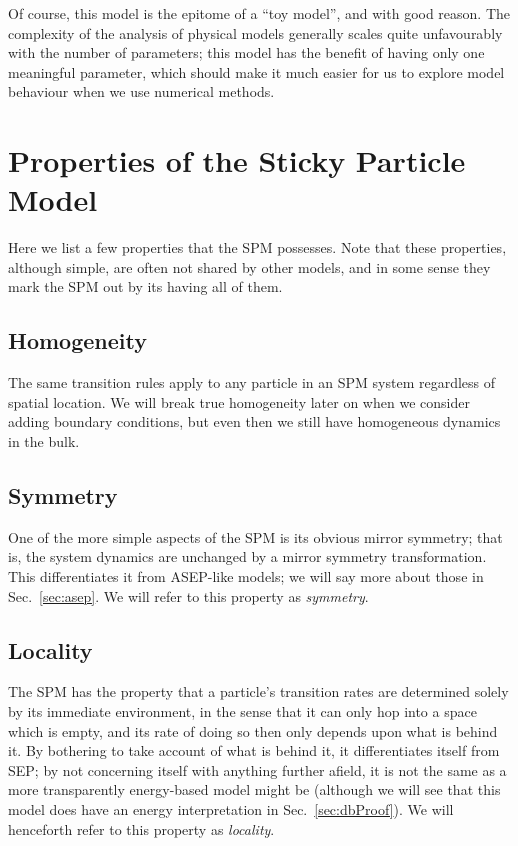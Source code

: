 Of course, this model is the epitome of a ``toy model'', and with good reason. The complexity of the
analysis of physical models generally scales quite unfavourably with the number of parameters; this model
has the benefit of having only one meaningful parameter, which should make it much easier for us
to explore model behaviour when we use numerical methods.

\section{Properties of the Sticky Particle Model}
Here we list a few properties that the SPM possesses. Note that these properties, although simple, are
often not shared by other models, and in some sense they mark the SPM out by its having all of them.
\subsection{Homogeneity}
The same transition rules apply to any particle in an SPM system regardless of spatial location.
We will break true homogeneity later on when we consider adding boundary conditions, but even then
we still have homogeneous dynamics in the bulk.
\subsection{Symmetry}
One of the more simple aspects of the SPM is its obvious mirror symmetry; that is, the system dynamics
are unchanged by a mirror symmetry transformation. This differentiates it from ASEP-like models; we
will say more about those in Sec.~\ref{sec:asep}. We will refer to this property as \textit{symmetry}.
\subsection{Locality}
The SPM has the property that a particle's transition rates are determined solely by its immediate
environment, in the sense that it can only hop into a space which is empty, and its rate of doing so
then only depends upon what is behind it. By bothering to take account of what is behind it, it 
differentiates itself from SEP; by not concerning itself with anything further afield, it is not the
same as a more transparently energy-based model might be (although we will see that this model does
have an energy interpretation in Sec.~\ref{sec:dbProof}). We will henceforth refer to this property
as \textit{locality}.
